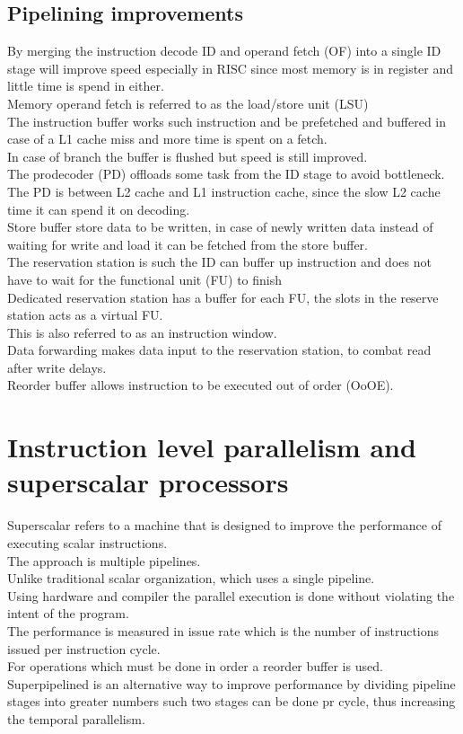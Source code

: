 \documentclass[12pt, a4paper]{article}
\begin{document}
		\subsection{Pipelining improvements}
			By merging the instruction decode ID and operand fetch (OF) into a single ID stage will improve speed especially in RISC since most memory is in register and little time is spend in either.\\
			Memory operand fetch is referred to as the load/store unit (LSU)\\
			The instruction buffer works such instruction and be prefetched and buffered in case of a L1 cache miss and more time is spent on a fetch.\\
			In case of branch the buffer is flushed but speed is still improved.\\
			The prodecoder (PD) offloads some task from the ID stage to avoid bottleneck.\\
			The PD is between L2 cache and L1 instruction cache, since the slow L2 cache time it can spend it on decoding.\\
			Store buffer store data to be written, in case of newly written data instead of waiting for write and load it can be fetched from the store buffer.\\
			The reservation station is such the ID can buffer up instruction and does not have to wait for the functional unit (FU) to finish\\
			Dedicated reservation station has a buffer for each FU, the slots in the reserve station acts as a virtual FU.\\
			This is also referred to as an instruction window.\\
			Data forwarding makes data input to the reservation station, to combat read after write delays.\\
			Reorder buffer allows instruction to be executed out of order (OoOE).
	\section{Instruction level parallelism and superscalar processors}
		Superscalar refers to a machine that is designed to improve the performance of executing scalar instructions.\\
		The approach is multiple pipelines.\\
		Unlike traditional scalar organization, which uses a single pipeline.\\
		Using hardware and compiler the parallel execution is done without violating the intent of the program.\\
		The performance is measured in issue rate which is the number of instructions issued per instruction cycle.\\
		For operations which must be done in order a reorder buffer is used.\\
		Superpipelined is an alternative way to improve performance by dividing pipeline stages into greater numbers such two stages can be done pr cycle, thus increasing the temporal parallelism.\\
\end{document}
